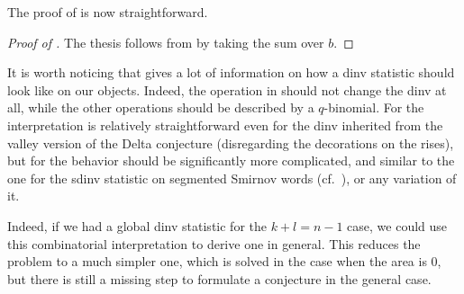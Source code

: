 \documentclass[reqno]{amsart}
\theoremstyle{plain}
\theoremstyle{definition}
\theoremstyle{remark}
\newcommand{\<}{\langle}
\renewcommand{\>}{\rangle}
\begin{document}
The proof of  is now straightforward.

\begin{proof}[Proof of ]
    The thesis follows from  by taking the sum over $b$.
\end{proof}

It is worth noticing that  gives a lot of information on how a dinv statistic should look like on our objects. Indeed, the operation in  should not change the dinv at all, while the other operations should be described by a $q$-binomial. For  the interpretation is relatively straightforward even for the dinv inherited from the valley version of the Delta conjecture (disregarding the decorations on the rises), but for  the behavior should be significantly more complicated, and similar to the one for the sdinv statistic on segmented Smirnov words (cf.\ \cite[Lemma~3.7]{IraciNadeauVandenWyngaerd2024Smirnov}), or any variation of it.

Indeed, if we had a global dinv statistic for the $k+l=n-1$ case, we could use this combinatorial interpretation to derive one in general. This reduces the problem to a much simpler one, which is solved in the case when the area is $0$, but there is still a missing step to formulate a conjecture in the general case.



\end{document}
